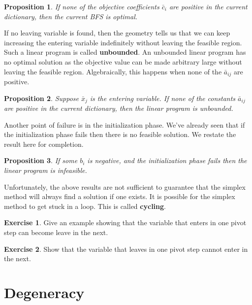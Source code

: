 \documentclass[
]{book}
\newtheorem{proposition}{Proposition}[chapter]
\theoremstyle{definition}
\theoremstyle{definition}
\theoremstyle{definition}
\newtheorem{exercise}{Exercise}[chapter]
\theoremstyle{definition}
\theoremstyle{remark}
\begin{document}
\begin{proposition}
If none of the objective coefficients \(\bar{c}_i\) are positive in the current dictionary, then the current BFS is optimal.
\end{proposition}

If no leaving variable is found, then the geometry tells us that we can keep increasing the entering variable indefinitely without leaving the feasible region. Such a linear program is called \textbf{unbounded}.
An unbounded linear program has no optimal solution as the objective value can be made arbitrary large without leaving the feasible region. Algebraically, this happens when none of the \(\bar{a}_{ij}\) are positive.

\begin{proposition}
Suppose \(\bar{x}_j\) is the entering variable. If none of the constants \(\bar{a}_{ij}\) are positive in the current dictionary, then the linear program is unbounded.
\end{proposition}

Another point of failure is in the initialization phase. We've already seen that if the initialization phase fails then there is no feasible solution. We restate the result here for completion.

\begin{proposition}
If some \(b_i\) is negative, and the initialization phase fails then the linear program is infeasible.
\end{proposition}

Unfortunately, the above results are not sufficient to guarantee that the simplex method will always find a solution if one exists. It is possible for the simplex method to get stuck in a loop. This is called \textbf{cycling}.

\begin{exercise}
Give an example showing that the variable that enters in one pivot step can become leave in the next.
\end{exercise}

\begin{exercise}
Show that the variable that leaves in one pivot step cannot enter in the next.
\end{exercise}

\hypertarget{degeneracy}{%
\section{Degeneracy}\label{degeneracy}}
\end{document}
